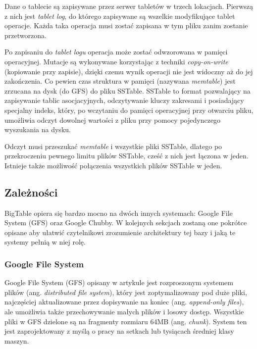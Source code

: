 
Dane o tablecie są zapisywane przez serwer tabletów w trzech lokacjach.
Pierwszą z nich jest \emph{tablet log}, do którego zapisywane są wszelkie modyfikujące tablet operacje.
Każda taka operacja musi zostać zapisana w tym pliku zanim zostanie przetworzona.

Po zapisaniu do \emph{tablet logu} operacja może zostać odwzorowana w pamięci operacyjnej.
Mutacje są wykonywane korzystając z techniki \emph{copy-on-write} (kopiowanie przy zapisie), dzięki czemu wynik operacji nie jest widoczny aż do jej zakończenia.
Co pewien czas struktura w pamięci (nazywana \emph{memtable}) jest zrzucana na dysk (do GFS) do pliku SSTable.
SSTable to format pozwalający na zapisywanie tablic asocjacyjnych, odczytywanie kluczy zakresami i posiadający specjalny indeks, który, po wczytaniu do pamięci operacyjnej przy otwarciu pliku, umożliwia odczyt dowolnej wartości z pliku przy pomocy pojedynczego wyszukania na dysku.

Odczyt musi przeszukać \emph{memtable} i wszystkie pliki SSTable, dlatego po przekroczeniu pewnego limitu plików SSTable, cześć z nich jest łączona w jeden.
Istnieje także możliwość połączenia wszystkich plików SSTable w jeden.

\subsection*{Zależności}
\label{sec:bigtable-zaleznosci}

BigTable opiera się bardzo mocno na dwóch innych systemach: Google File System (GFS) oraz Google Chubby.
W kolejnych sekcjach zostaną one pokrótce opisane aby ułatwić czytelnikowi zrozumienie architektury tej bazy i jaką te systemy pełnią w niej rolę.

\subsubsection*{Google File System}

Google File System (GFS) opisany w artykule \cite{google-file-system} jest rozproszonym systemem plików (ang. \emph{distributed file system}), który jest zoptymalizowany pod duże pliki, najczęściej aktualizowane przez dopisywanie na koniec (ang. \emph{append-only files}), ale umożliwia także przechowywanie małych plików i losowy dostęp.
Wszystkie pliki w GFS dzielone są na fragmenty rozmiaru 64MB (ang. \emph{chunk}).
System ten jest zaprojektowany z myślą o pracy na setkach lub tysiącach średniej klasy maszyn.

